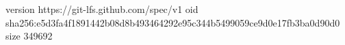 version https://git-lfs.github.com/spec/v1
oid sha256:e5d3fa4f1891442b08d8b493464292e95c344b5499059ce9d0e17fb3ba0d90d0
size 349692
